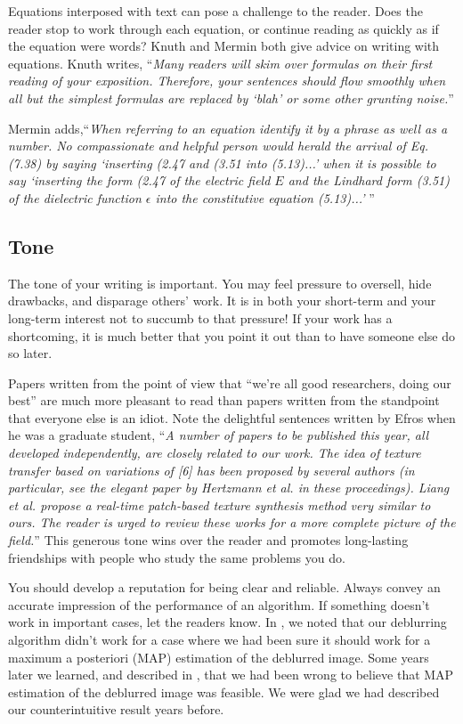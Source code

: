 Equations interposed with text can pose a challenge to the reader.  Does the reader stop to work through each equation, or continue reading as quickly as if the equation were words?  Knuth \cite{Knuth1989} and Mermin \cite{Mermin1989} both give advice on writing with equations.  Knuth writes,
``{\em Many readers will skim over formulas on their first reading of your exposition.  Therefore, your sentences should flow smoothly when all but the simplest formulas are replaced by `blah' or some other grunting noise.}''

Mermin adds,``{\em When referring to an equation identify it by a phrase as well as a number.  No compassionate and helpful person would herald the arrival of Eq. (7.38) by saying `inserting (2.47 and (3.51 into (5.13)...' when it is possible to say `inserting the form (2.47 of the electric field $E$ and the Lindhard form (3.51) of the dielectric function $\epsilon$ into the constitutive equation (5.13)...' }''


\subsection{Tone}

The tone of your writing is important.  You may feel pressure to oversell, hide drawbacks, and disparage others’ work.  It is in both your short-term and your long-term interest not to succumb to that pressure!  If your work has a shortcoming, it is much better that you point it out than to have someone else do so later.

Papers written from the point of view that ``we're all good researchers, doing our best'' are much more pleasant to read than papers written from the standpoint that everyone else is an idiot.  Note the delightful sentences written by Efros \cite{Efros01} when he was a graduate student, ``{\em A number of papers to be published this year, all developed independently, are closely related to our work.  The idea of texture transfer based on variations of [6] has been proposed by several authors (in particular, see the elegant paper by Hertzmann et al. in these proceedings).  Liang et al. propose a real-time patch-based texture synthesis method very similar to ours.  The reader is urged to review these works for a more complete picture of the field.}''  This generous tone wins over the reader and promotes long-lasting friendships with people who study the same problems you do.

You should develop a reputation for being clear and reliable.  Always convey an accurate impression of the performance of an algorithm.  If something doesn't work in important cases, let the readers know.  In \cite{Fergus2006}, we noted that our deblurring algorithm didn't work for a case where we had been sure it should work for a  maximum a posteriori (MAP)  estimation of the deblurred image. Some years later we learned, and described in \cite{Levin2011}, that we had been wrong to believe that MAP estimation of the deblurred image was feasible.  We were glad we had described our counterintuitive result years before.


